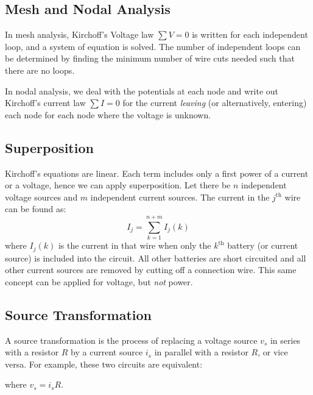 \documentclass{article}
\begin{document}
    \subsection{Mesh and Nodal Analysis}
    In mesh analysis, Kirchoff's Voltage law $\sum V = 0$ is written for each independent loop, and a system of equation is solved. The number of independent loops can be determined by finding the minimum number of wire cuts needed such that there are no loops.

    In nodal analysis, we deal with the potentials at each node and write out Kirchoff's current law $\sum I = 0$ for the current \textit{leaving} (or alternatively, entering) each node for each node where the voltage is unknown.
    \subsection{Superposition}
    Kirchoff's equations are linear. Each term includes only a first power of a current or a voltage, hence we can apply superposition. Let there be $n$ independent voltage sources and $m$ independent current sources. The current in the $j^\text{th}$ wire can be found as:
    \begin{equation}
        I_j = \sum_{k=1}^{n+m} I_j(k)
    \end{equation}
    where $I_j(k)$ is the current in that wire when only the $k^\text{th}$ battery (or current source) is included into the circuit. All other batteries are short circuited and all other current sources are removed by cutting off a connection wire. This same concept can be applied for voltage, but \textit{not} power.
    \subsection{Source Transformation}
    A source transformation is the process of replacing a voltage source $v_s$ in series with a resistor $R$ by a current source $i_s$ in parallel with a resistor $R$, or vice versa. For example, these two circuits are equivalent:
    \begin{center}
    \end{center}
    where $v_s=i_sR$.
\end{document}
